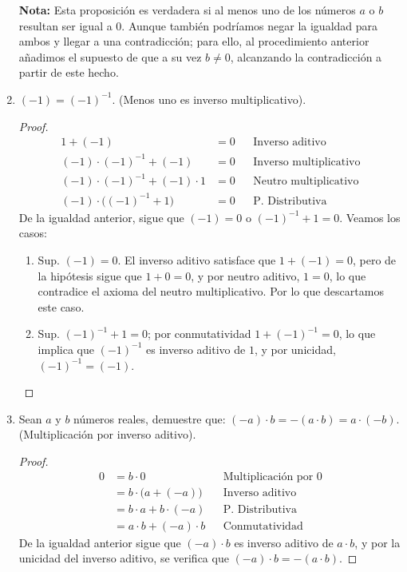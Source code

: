 \documentclass[11pt]{article}
\begin{document}
\begin{enumerate}[label=\alph*)]
    \textbf{Nota:} Esta proposición es verdadera si al menos uno de los números $a$ o $b$ resultan ser igual a $0$. Aunque también podríamos negar la igualdad para ambos y llegar a una contradicción; para ello, al procedimiento anterior añadimos el supuesto de que a su vez $b\neq0$, alcanzando la contradicción a partir de este hecho.

    \item $(-1)=(-1)^{-1}$. (Menos uno es inverso multiplicativo).
    
    \vspace{-1em}\begin{proof} 
        \begin{align*}
            1 + (-1) &= 0 && \text{Inverso aditivo}\\
            (-1)\cdot (-1)^{-1} + (-1) &= 0 && \text{Inverso multiplicativo}\\
            (-1)\cdot (-1)^{-1} + (-1) \cdot 1 &= 0 && \text{Neutro multiplicativo}\\
            (-1) \cdot \bigl((-1)^{-1} + 1\bigr) &= 0 && \text{P. Distributiva}
        \end{align*} De la igualdad anterior, sigue que $(-1)=0$ o $(-1)^{-1} + 1=0$. Veamos los casos: \begin{enumerate}[label=\roman*)]
            \item Sup. $(-1)=0$. El inverso aditivo satisface que $1+(-1)=0$, pero de la hipótesis sigue que $1+0=0$, y por neutro aditivo, $1=0$, lo que contradice el axioma del neutro multiplicativo. Por lo que descartamos este caso.
            \item Sup. $(-1)^{-1} + 1=0$; por conmutatividad $1+(-1)^{-1}=0$, lo que implica que $(-1)^{-1}$ es inverso aditivo de $1$, y por unicidad, $(-1)^{-1}=(-1)$. \qedhere
        \end{enumerate}
    \end{proof} \vspace{-1em}

    \item Sean $a$ y $b$ números reales, demuestre que: $ (-a) \cdot b = -(a \cdot b) = a \cdot (-b)$. (Multiplicación por inverso aditivo).%
    
    \vspace{-1em}\begin{proof} 
        \begin{align*}
            0 &= b\cdot 0 && \text{Multiplicación por $0$}\\
            &= b \cdot \bigl(a+(-a)\bigr) && \text{Inverso aditivo}\\
            &= b\cdot a + b\cdot (-a) && \text{P. Distributiva}\\
            &= a\cdot b + (-a) \cdot b && \text{Conmutatividad}
        \end{align*} De la igualdad anterior sigue que $(-a)\cdot b$ es inverso aditivo de $a\cdot b$, y por la unicidad del inverso aditivo, se verifica que $(-a)\cdot b = -(a\cdot b)$.
        

\end{proof}
\end{enumerate}
\end{document}
